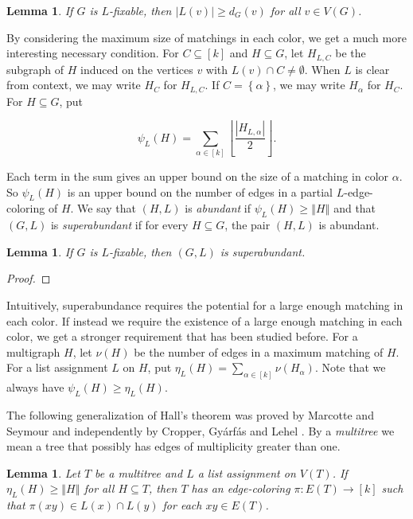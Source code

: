 \documentclass[12pt]{article}
\theoremstyle{plain}
\newtheorem{lem}[thm]{Lemma}
\theoremstyle{definition}
\theoremstyle{remark}
\newcommand{\set}[1]{\left\{ #1 \right\}}
\newcommand{\card}[1]{\left|#1\right|}
\newcommand{\size}[1]{\left\Vert#1\right\Vert}
\newcommand{\floor}[1]{\left\lfloor#1\right\rfloor}
\newcommand{\func}[3]{#1\colon #2 \rightarrow #3}
\newcommand{\irange}[1]{\left[#1\right]}
\begin{document}
\begin{lem}\label{DegreeNecessaryCondition}
If $G$ is $L$-fixable, then $|L(v)| \ge d_G(v)$ for all $v \in V(G)$.
\end{lem}

By considering the maximum size of matchings in each color, we get a much more interesting necessary condition.
For $C \subseteq \irange{k}$ and $H \subseteq G$, let $H_{L, C}$ be the
subgraph of $H$ induced on the vertices $v$ with $L(v) \cap C \ne \emptyset$. 
When $L$ is clear from context, we may write $H_C$ for $H_{L,C}$. If $C =
\set{\alpha}$, we may write $H_\alpha$ for $H_C$.  For $H \subseteq G$, put

\[\psi_L(H) = \sum_{\alpha \in \irange{k}} \floor{\frac{\card{H_{L, \alpha}}}{2}}.\]

Each term in the sum gives an upper bound on the size of a matching in color
$\alpha$. So $\psi_L(H)$ is an upper bound on the number of edges in a
partial $L$-edge-coloring of $H$.  We say that $(H, L)$ is \emph{abundant} if
$\psi_L(H) \ge \size{H}$ and that $(G,L)$ is \emph{superabundant} if for every
$H \subseteq G$, the pair $(H, L)$ is abundant.  

\begin{lem}\label{SuperabundanceIsNecessary}
If $G$ is $L$-fixable, then $(G, L)$ is superabundant.
\end{lem}
\begin{proof}
\end{proof}

Intuitively, superabundance requires the potential for a large enough matching in each color. If instead we require the existence of a large enough matching in each color, we get a stronger requirement that has been studied before. For a multigraph $H$, let $\nu(H)$ be the number of edges in a maximum matching of $H$. 
For a list assignment $L$ on $H$, put $\eta_L(H) = \sum_{\alpha \in \irange{k}} \nu(H_\alpha)$.  Note that we always have $\psi_L(H) \ge \eta_L(H)$.

The following generalization of Hall's theorem was proved by Marcotte and Seymour \cite{marcotte1990extending} and independently by Cropper, Gy{\'a}rf{\'a}s and Lehel \cite{cropper2003edge}.  By a \emph{multitree} we mean a tree that possibly has edges of multiplicity greater than one.

\begin{lem}\label{MultiTreeHall}
Let $T$ be a multitree and $L$ a list assignment on $V(T)$.  If $\eta_L(H) \ge \size{H}$ for all $H \subseteq T$, then $T$ has an edge-coloring $\func{\pi}{E(T)}{\irange{k}}$ such that
$\pi(xy) \in L(x) \cap L(y)$ for each $xy \in E(T)$.
\end{lem}
\end{document}
